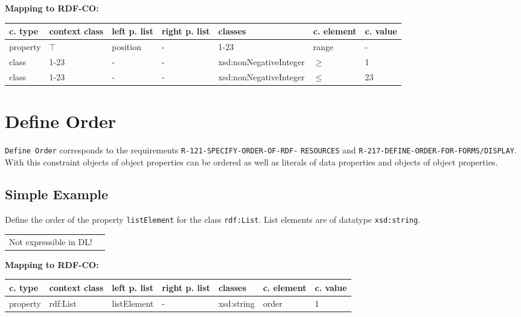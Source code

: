 \documentclass{llncs}
\newcommand{\ms}[1]{\texttt{#1}}
\newenvironment{gcotable}{
  \scriptsize
  \sffamily
  \vspace{0cm}
	\begin{center}
	\textbf{\vspace{0.4cm}Mapping to RDF-CO:} \\
  \begin{tabular}{l|l|l|l|l|l|l}
	\hline
  \textbf{c. type} & \textbf{context class} & \textbf{left p. list} & \textbf{right p. list} & \textbf{classes} & \textbf{c. element} & \textbf{c. value} \\
  \hline

}{
  \hline
  \end{tabular}
	\end{center}
}
\newenvironment{DL}{
  \vspace{0cm}
	\begin{center}
  \begin{tabular}{r l}

}{
  \end{tabular}
	\end{center}
}
\begin{document}
%

\begin{gcotable}
property & $\top$ & position & - & 1-23 & range & - \\
class & 1-23 & - & - & xsd:nonNegativeInteger & $\geq$ & 1 \\
class & 1-23 & - & - & xsd:nonNegativeInteger & $\leq$ & 23 \\
\end{gcotable}

%

\section{Define Order}

\ms{Define Order} corresponds to the requirements
\ms{R-121-SPECIFY-ORDER-OF-RDF-} \ms{RESOURCES} and
\ms{R-217-DEFINE-ORDER-FOR-FORMS/DISPLAY}.
With this constraint objects of object properties can be ordered as well as literals of data properties and objects of object properties.

\subsection{Simple Example}

Define the order of the property \ms{listElement} for the class \ms{rdf:List}.
List elements are of datatype \ms{xsd:string}.

\begin{DL}
Not expressible in DL!
\end{DL}

\begin{gcotable}
property & rdf:List & listElement & - & xsd:string & order & 1 \\
\end{gcotable}
\end{document}
